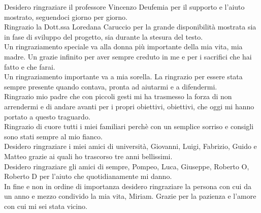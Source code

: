 Desidero ringraziare il professore Vincenzo Deufemia per il supporto e l'aiuto mostrato, seguendoci giorno per giorno.\\
Ringrazio la Dott.ssa Loredana Caruccio per la grande disponibilità mostrata sia in fase di sviluppo del progetto, sia durante la stesura del testo.\\
Un ringraziamento speciale va alla donna più importante della mia vita, mia madre. Un grazie infinito per aver sempre creduto in me e per i sacrifici che hai fatto e che farai.\\
Un ringraziamento importante va a  mia sorella. La ringrazio per essere stata sempre presente quando contava, pronta ad aiutarmi e a difendermi.\\
Ringrazio mio padre che con piccoli gesti mi ha trasmesso la forza di non arrendermi e di andare avanti per i propri obiettivi, obiettivi, che oggi mi hanno portato a questo traguardo.\\
Ringrazio di cuore tutti i miei familiari perchè con un semplice sorriso e consigli sono stati sempre al mio fianco.\\
Desidero ringraziare i miei amici di università, Giovanni, Luigi, Fabrizio, Guido e Matteo grazie ai quali ho trascorso tre anni bellissimi.\\ 
Desidero ringraziare gli amici di sempre, Pompeo, Luca, Giuseppe, Roberto O, Roberto D per l'aiuto che quotidianamente mi danno.\\
In fine e non in ordine di importanza desidero ringraziare la persona con cui da un anno e mezzo condivido la mia vita, Miriam. Grazie per la pazienza e l'amore con cui mi sei stata vicino.